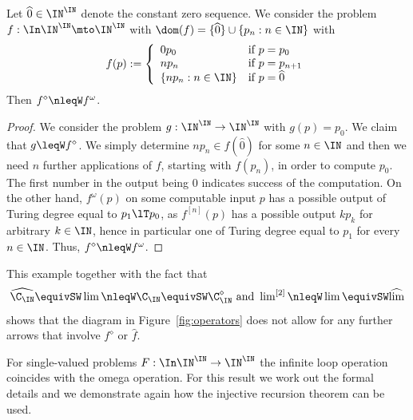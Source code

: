 \documentclass{lmcs}
\begin{document}
\begin{exa}
\label{example:diamond-omega}
Let $\widehat{0}\in\IN^\IN$ denote the constant zero sequence. We consider the problem $f:\In\IN^\IN\mto\IN^\IN$
with $\dom(f)=\{\widehat{0}\}\cup\{p_n:n\in\IN\}$ with
\[f(p):=\left\{\begin{array}{ll}
0p_0 & \mbox{if $p=p_0$}\\
np_n & \mbox{if $p=p_{n+1}$}\\
\{np_n:n\in\IN\} & \mbox{if $p=\widehat{0}$}
\end{array}\right.\]
Then $f^\diamond\nleqW f^\omega$.
\end{exa}
\begin{proof}
We consider the problem $g:\IN^\IN\to\IN^\IN$ with $g(p)=p_0$. We claim that $g\leqW f^\diamond$.
We simply determine $np_n\in f(\widehat{0})$ for some $n\in\IN$ and then we need $n$ further applications of $f$, starting with $f(p_n)$,
in order to compute $p_0$. The first number in the output being $0$ indicates success of the computation.
On the other hand, $f^\omega(p)$ on some computable input $p$ has
a possible output of Turing degree equal to $p_1 \lT p_0$, as $f^{[n]}(p)$ has a possible output $kp_k$ for arbitrary $k\in\IN$, hence in particular one of Turing degree equal to $p_{1}$ for every $n\in\IN$. 
Thus, $f^\diamond\nleqW f^\omega$.
\end{proof}

\noindent
This example together with the fact that 
\[\widehat{\C_\IN}\equivSW\lim\nleqW\C_\IN\equivSW\C_\IN^\diamond\mbox{ and }\lim\nolimits^{[2]}\nleqW\lim\equivSW\widehat{\lim}\]
shows that the diagram in Figure~\ref{fig:operators} does not allow for any further arrows that involve
$f^\diamond$ or $\widehat{f}$.


For single-valued problems $F:\In\IN^\IN\to\IN^\IN$ the infinite loop operation coincides with the omega operation.
For this result we work out the formal details and we demonstrate again how the injective recursion theorem can be used.
\end{document}
